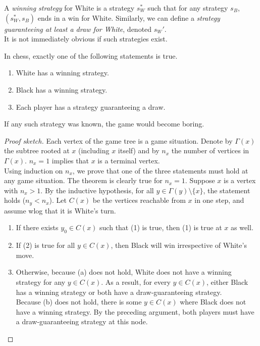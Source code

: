 	A \emph{winning strategy} for White is a strategy $s_W^*$ such that for any strategy $s_B$, $(s_W^*,s_B)$ ends in a win for White. Similarly, we can define a \emph{strategy guaranteeing at least a draw for White}, denoted $s_W'$.\\
	It is not immediately obvious if such strategies exist.

	\begin{ftheo}
		In chess, exactly one of the following statements is true.
		\begin{enumerate}[label=(\arabic*)]
			\item White has a winning strategy.
			\item Black has a winning strategy.
			\item Each player has a strategy guaranteeing a draw.
		\end{enumerate}
	\end{ftheo}

	If any such strategy was known, the game would become boring.

	\begin{proof}[Proof sketch]
		Each vertex of the game tree is a game situation. Denote by $\Gamma(x)$ the subtree rooted at $x$ (including $x$ itself) and by $n_x$ the number of vertices in $\Gamma(x)$. $n_x = 1$ implies that $x$ is a terminal vertex.\\
		Using induction on $n_x$, we prove that one of the three statements must hold at any game situation. The theorem is clearly true for $n_x = 1$. Suppose $x$ is a vertex with $n_x > 1$. By the inductive hypothesis, for all $y \in \Gamma(y) \setminus \{x\}$, the statement holds ($n_y < n_x$). Let $C(x)$ be the vertices reachable from $x$ in one step, and assume wlog that it is White's turn.
		\begin{enumerate}[label=(\alph*)]
			\item If there exists $y_0 \in C(x)$ such that (1) is true, then (1) is true at $x$ as well.
			\item If (2) is true for all $y \in C(x)$, then Black will win irrespective of White's move.
			\item Otherwise, because (a) does not hold, White does not have a winning strategy for any $y \in C(x)$. As a result, for every $y \in C(x)$, either Black has a winning strategy or both have a draw-guaranteeing strategy.\\
			Because (b) does not hold, there is some $y \in C(x)$ where Black does not have a winning strategy. By the preceding argument, both players must have a draw-guaranteeing strategy at this node. \qedhere
		\end{enumerate}
	\end{proof}

